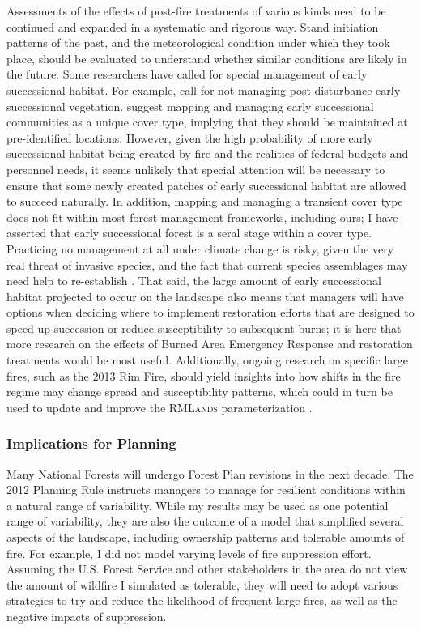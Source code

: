 Assessments of the effects of post-fire treatments of various kinds need to be continued and expanded in a systematic and rigorous way. Stand initiation patterns of the past, and the meteorological condition under which they took place, should be evaluated to understand whether similar conditions are likely in the future. Some researchers have called for special management of early successional habitat. For example, \citet{Dellasala2014} call for not managing post-disturbance early successional vegetation. \citet{Swanson2011} suggest mapping and managing early successional communities as a unique cover type, implying that they should be maintained at pre-identified locations. However, given the high probability of more early successional habitat being created by fire and the realities of federal budgets and personnel needs, it seems unlikely that special attention will be necessary to ensure that some newly created patches of early successional habitat are allowed to succeed naturally. In addition, mapping and managing a transient cover type does not fit within most forest management frameworks, including ours; I have asserted that early successional forest is a seral stage within a cover type. Practicing no management at all under climate change is risky, given the very real threat of invasive species, and the fact that current species assemblages may need help to re-establish \citep{Stephens2010}. That said, the large amount of early successional habitat projected to occur on the landscape also means that managers will have options when deciding where to implement restoration efforts that are designed to speed up succession or reduce susceptibility to subsequent burns; it is here that more research on the effects of Burned Area Emergency Response and restoration treatments would be most useful. Additionally, ongoing research on specific large fires, such as the 2013 Rim Fire, should yield insights into how shifts in the fire regime may change spread and susceptibility patterns, which could in turn be used to update and improve the \textsc{RMLands} parameterization \citep{Lydersen2014}.




\subsubsection{Implications for Planning}
Many National Forests will undergo Forest Plan revisions in the next decade. The 2012 Planning Rule instructs managers to manage for resilient conditions within a natural range of variability. While my results may be used as one potential range of variability, they are also the outcome of a model that simplified several aspects of the landscape, including ownership patterns and tolerable amounts of fire. For example, I did not model varying levels of fire suppression effort. Assuming the U.S. Forest Service and other stakeholders in the area do not view the amount of wildfire I simulated as tolerable, they will need to adopt various strategies to try and reduce the likelihood of frequent large fires, as well as the negative impacts of suppression. 

